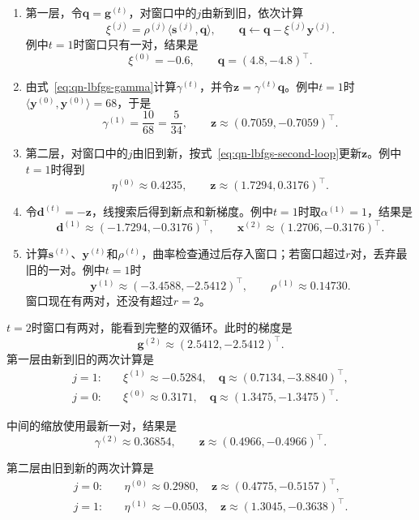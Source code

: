 \begin{enumerate}
\item 第一层，令$\bm{q}=\bm{g}^{(t)}$，对窗口中的$j$由新到旧，依次计算
\[
 \xi^{(j)}=\rho^{(j)}\langle\bm{s}^{(j)},\bm{q}\rangle,\qquad\bm{q}\leftarrow\bm{q}-\xi^{(j)}\bm{y}^{(j)}.
\]
例中$t=1$时窗口只有一对，结果是
\[
 \xi^{(0)}=-0.6,\qquad\bm{q}=(4.8,-4.8)^\top.
\]

\item 由式~\eqref{eq:qn-lbfgs-gamma}计算$\gamma^{(t)}$，并令$\bm{z}=\gamma^{(t)}\bm{q}$。例中$t=1$时$\langle\bm{y}^{(0)},\bm{y}^{(0)}\rangle=68$，于是
\[
 \gamma^{(1)}=\frac{10}{68}=\frac{5}{34},\qquad\bm{z}\approx(0.7059,-0.7059)^\top.
\]

\item 第二层，对窗口中的$j$由旧到新，按式~\eqref{eq:qn-lbfgs-second-loop}更新$\bm{z}$。例中$t=1$时得到
\[
 \eta^{(0)}\approx0.4235,\qquad\bm{z}\approx(1.7294,0.3176)^\top.
\]

\item 令$\bm{d}^{(t)}=-\bm{z}$，线搜索后得到新点和新梯度。例中$t=1$时取$\alpha^{(1)}=1$，结果是
\[
 \bm{d}^{(1)}\approx(-1.7294,-0.3176)^\top,\qquad\bm{x}^{(2)}\approx(1.2706,-0.3176)^\top.
\]

\item 计算$\bm{s}^{(t)}$、$\bm{y}^{(t)}$和$\rho^{(t)}$，曲率检查通过后存入窗口；若窗口超过$r$对，丢弃最旧的一对。例中$t=1$时
\[
 \bm{y}^{(1)}\approx(-3.4588,-2.5412)^\top,\qquad\rho^{(1)}\approx0.14730.
\]
窗口现在有两对，还没有超过$r=2$。
\end{enumerate}

$t=2$时窗口有两对，能看到完整的双循环。此时的梯度是
\[
 \bm{g}^{(2)}\approx(2.5412,-2.5412)^\top.
\]
第一层由新到旧的两次计算是
\[
 \begin{aligned}
 j=1:&\quad\xi^{(1)}\approx-0.5284,\quad\bm{q}\approx(0.7134,-3.8840)^\top,\\
 j=0:&\quad\xi^{(0)}\approx0.3171,\quad\bm{q}\approx(1.3475,-1.3475)^\top.
 \end{aligned}
\]

中间的缩放使用最新一对，结果是
\[
 \gamma^{(2)}\approx0.36854,\qquad\bm{z}\approx(0.4966,-0.4966)^\top.
\]

第二层由旧到新的两次计算是
\[
 \begin{aligned}
 j=0:&\quad\eta^{(0)}\approx0.2980,\quad\bm{z}\approx(0.4775,-0.5157)^\top,\\
 j=1:&\quad\eta^{(1)}\approx-0.0503,\quad\bm{z}\approx(1.3045,-0.3638)^\top.
 \end{aligned}
\]

